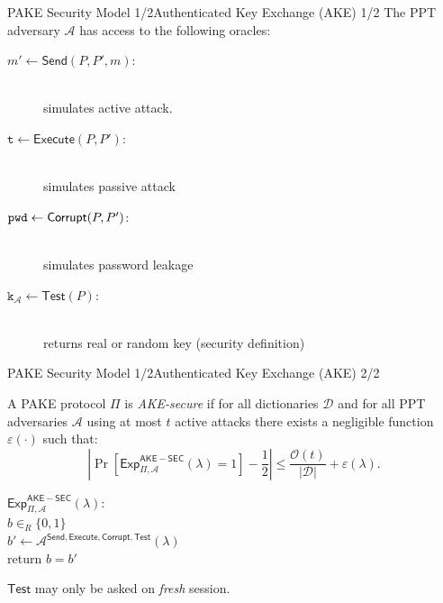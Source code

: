 \documentclass[notes,xcolor=dvipsnames]{beamer}
\begin{document}
\begin{frame}{PAKE Security Model 1/2}{Authenticated Key Exchange (AKE) 1/2}
The PPT adversary $\mathcal{A}$ has access to the following oracles:
\begin{description}
    \item[$m'\gets\mathsf{Send}(P,P',m)$:] \hfill \\ simulates active attack.
    \item[$\mathtt{t}\gets\mathsf{Execute}(P,P')$:] \hfill \\ simulates passive attack
    \item[$\mathtt{pwd}\gets\mathsf{Corrupt}(P, P')$:] \hfill \\ simulates password leakage
    \item[$\mathtt{k}_\mathcal{A}\gets\mathsf{Test}(P)$:] \hfill \\ returns real or random key (security definition)
\end{description}
\end{frame}

\begin{frame}{PAKE Security Model 1/2}{Authenticated Key Exchange (AKE) 2/2}
\begin{definition}\label{def:ake}
A PAKE protocol $\Pi$ is \emph{AKE-secure} if for all dictionaries $\mathcal{D}$ and for all PPT adversaries $\mathcal{A}$ using at most $t$ active attacks there exists a negligible function $\varepsilon(\cdot)$ such that:
\[\left|\Pr[\mathsf{Exp}_{\Pi,\mathcal{A}}^{\mathsf{AKE-SEC}}(\lambda)=1]-\frac12\right|\leq \frac{\mathcal{O}(t)}{|\mathcal{D}|}+\varepsilon(\lambda).\]

\noindent$\mathsf{Exp}_{\Pi,\mathcal{A}}^{\mathsf{AKE-SEC}}(\lambda):$ \\
\hspace*{2em} $b\in_R\{0,1\}$\\
\hspace*{2em} $b'\gets\mathcal{A}^{\mathsf{Send},\mathsf{Execute},\mathsf{Corrupt},\mathsf{Test}}(\lambda)$\\
\hspace*{2em} return $b=b'$
\end{definition}
$\mathsf{Test}$ may only be asked on \emph{fresh} session.
\end{frame}
\end{document}
